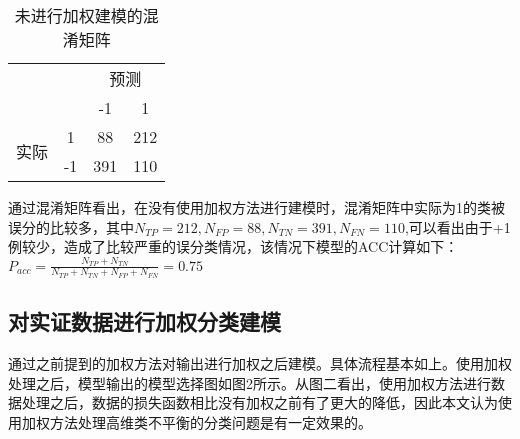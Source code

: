 \documentclass[
]{ctexart}
\begin{document}
\begin{table}[htbp]
  \centering
  \caption{未进行加权建模的混淆矩阵}
    \begin{tabular}{|c|c|c|c|}
    \toprule
    \multicolumn{2}{|c|}{\multirow{4}[4]{*}{\textcolor[rgb]{ .2,  .2,  .2}{}}} & \multicolumn{2}{c|}{\multirow{3}[2]{*}{\textcolor[rgb]{ .2,  .2,  .2}{预测}}} \\
    \multicolumn{2}{|c|}{} & \multicolumn{2}{c|}{} \\
    \multicolumn{2}{|c|}{} & \multicolumn{2}{c|}{} \\
\cmidrule{3-4}    \multicolumn{2}{|c|}{} & \textcolor[rgb]{ .2,  .2,  .2}{-1} & \textcolor[rgb]{ .2,  .2,  .2}{1} \\
    \midrule
    \multicolumn{1}{|c|}{\multirow{4}[4]{*}{\textcolor[rgb]{ .2,  .2,  .2}{实际}}} & \multirow{2}[2]{*}{\textcolor[rgb]{ .2,  .2,  .2}{1}} & \multirow{2}[2]{*}{\textcolor[rgb]{ .2,  .2,  .2}{88}} & \multirow{2}[2]{*}{\textcolor[rgb]{ .2,  .2,  .2}{212}} \\
          &       &       &  \\
\cmidrule{2-4}          & \multirow{2}[2]{*}{\textcolor[rgb]{ .2,  .2,  .2}{-1}} & \multirow{2}[2]{*}{\textcolor[rgb]{ .2,  .2,  .2}{391}} & \multirow{2}[2]{*}{\textcolor[rgb]{ .2,  .2,  .2}{110}} \\
          &       &       &  \\
    \bottomrule
    \end{tabular}%
  \label{tab:addlabel}%
\end{table}

通过混淆矩阵看出，在没有使用加权方法进行建模时，混淆矩阵中实际为1的类被误分的比较多，其中\(N_{TP}=212,N_{FP}=88,N_{TN}=391,N_{FN}=110\),可以看出由于+1例较少，造成了比较严重的误分类情况，该情况下模型的ACC计算如下：\(P_{a c c}=\frac{N_{T P}+N_{T N}}{N_{T P}+N_{T N}+N_{F P}+N_{F N}}=0.75\)

\hypertarget{ux5bf9ux5b9eux8bc1ux6570ux636eux8fdbux884cux52a0ux6743ux5206ux7c7bux5efaux6a21}{%
\subsection{对实证数据进行加权分类建模}\label{ux5bf9ux5b9eux8bc1ux6570ux636eux8fdbux884cux52a0ux6743ux5206ux7c7bux5efaux6a21}}

通过之前提到的加权方法对输出进行加权之后建模。具体流程基本如上。使用加权处理之后，模型输出的模型选择图如图2所示。从图二看出，使用加权方法进行数据处理之后，数据的损失函数相比没有加权之前有了更大的降低，因此本文认为使用加权方法处理高维类不平衡的分类问题是有一定效果的。
\end{document}

